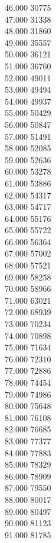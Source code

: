 { 46.000	30775 \\
 47.000	31338 \\
 48.000	31860 \\
 49.000	35557 \\
 50.000	36121 \\
 51.000	36760 \\
 52.000	49011 \\
 53.000	49494 \\
 54.000	49937 \\
 55.000	50429 \\
 56.000	50847 \\
 57.000	51491 \\
 58.000	52085 \\
 59.000	52636 \\
 60.000	53278 \\
 61.000	53886 \\
 62.000	54317 \\
 63.000	54717 \\
 64.000	55176 \\
 65.000	55722 \\
 66.000	56364 \\
 67.000	57002 \\
 68.000	57521 \\
 69.000	58258 \\
 70.000	58966 \\
 71.000	63021 \\
 72.000	68939 \\
 73.000	70234 \\
 74.000	70898 \\
 75.000	71634 \\
 76.000	72310 \\
 77.000	72886 \\
 78.000	74454 \\
 79.000	74986 \\
 80.000	75648 \\
 81.000	76108 \\
 82.000	76685 \\
 83.000	77377 \\
 84.000	77883 \\
 85.000	78329 \\
 86.000	78909 \\
 87.000	79550 \\
 88.000	80017 \\
 89.000	80497 \\
 90.000	81123 \\
 91.000	81785 \\
}
